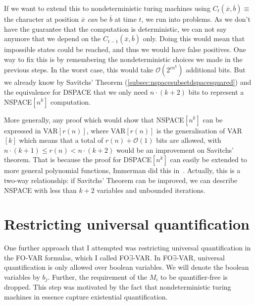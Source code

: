 If we want to extend this to nondeterministic turing machines using $C_{t}(\overline{x}, \overline{b}) \equiv $ the character at position $\overline{x}$ \emph{can} be $\overline{b}$ at time $t$, we run into problems.
As we don't have the guarantee that the computation is deterministic, we can not say anymore that we depend on the $C_{t - 1}(\overline{x}, \overline{b})$ only.
Doing this would mean that impossible states could be reached, and thus we would have false positives.
One way to fix this is by remembering the nondeterministic choices we made in the previous steps.
In the worst case, this would take $\mathcal{O}(2^{cn^k})$ additional bits.
But we already know by Savitchs' Theorem (\cref{subsec:nspacesubsetdspacesquared}) and the equivalence for DSPACE that we only need $n \cdot (k + 2)$ bits to represent a NSPACE$[n^k]$ computation.

More generally, any proof which would show that NSPACE$[n^k]$ can be expressed in VAR$[r(n)]$, where VAR$[r(n)]$ is the generalisation of VAR$[k]$ which means that a total of $r(n) + \mathcal{O}(1)$ bits are allowed, with $n \cdot (k + 1) \leq r(n) < n \cdot (k + 2)$ would be an improvement on Savitchs' theorem.
That is because the proof for DSPACE$[n^k]$ can easily be extended to more general polynomial functions, Immerman did this in~\cite{Immerman1999}.
Actually, this is a two-way relationship: if Savitchs' Theorem can be improved, we can describe NSPACE with less than $k + 2$ variables and unbounded iterations.

\section{Restricting universal quantification}\label{sec:restricting-universal-quantification}

One further approach that I attempted was restricting universal quantification in the FO-VAR formulas, which I called FO$\exists$-VAR\@.
In FO$\exists$-VAR, universal quantification is only allowed over boolean variables.
We will denote the boolean variables by $b_j$.
Further, the requirement of the $M_i$ to be quantifier-free is dropped.
This step was motivated by the fact that nondeterministic turing machines in essence capture existential quantification.

